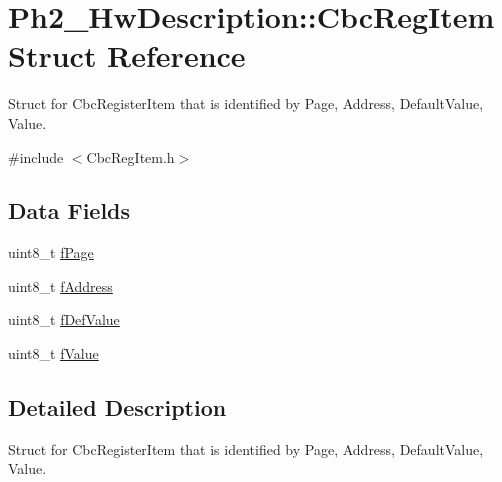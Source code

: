 \hypertarget{struct_ph2___hw_description_1_1_cbc_reg_item}{\section{Ph2\-\_\-\-Hw\-Description\-:\-:Cbc\-Reg\-Item Struct Reference}
\label{struct_ph2___hw_description_1_1_cbc_reg_item}
}


Struct for Cbc\-Register\-Item that is identified by Page, Address, Default\-Value, Value.  




{\ttfamily \#include $<$Cbc\-Reg\-Item.\-h$>$}

\subsection*{Data Fields}
\begin{DoxyCompactItemize}
\item 
uint8\-\_\-t \hyperlink{struct_ph2___hw_description_1_1_cbc_reg_item_a082fb29397d4a4e2ccbf4563c1385e6e}{f\-Page}
\item 
uint8\-\_\-t \hyperlink{struct_ph2___hw_description_1_1_cbc_reg_item_a67f6d52003832c42c7747f304d50a87d}{f\-Address}
\item 
uint8\-\_\-t \hyperlink{struct_ph2___hw_description_1_1_cbc_reg_item_a7c958bb4e0cd79891f3d3a191ef2f749}{f\-Def\-Value}
\item 
uint8\-\_\-t \hyperlink{struct_ph2___hw_description_1_1_cbc_reg_item_a1fa052a53215cbee674174febcc52b6a}{f\-Value}
\end{DoxyCompactItemize}


\subsection{Detailed Description}
Struct for Cbc\-Register\-Item that is identified by Page, Address, Default\-Value, Value. 

